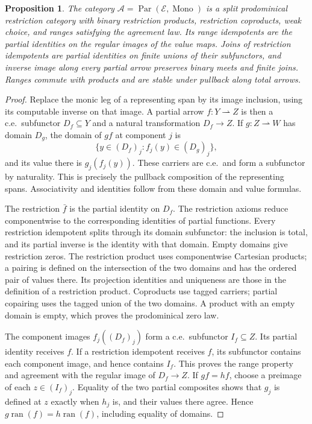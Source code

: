 \documentclass[11pt]{article}
\newtheorem{proposition}[theorem]{Proposition}
\newcommand{\ran}{\operatorname{ran}}
\begin{document}
\begin{proposition}\label{prop:fork-structure}
The category $\mathcal A=\operatorname{Par}(\mathcal E,
\operatorname{Mono})$ is a split prodominical restriction category
with binary restriction products, restriction coproducts, weak
choice, and ranges satisfying the agreement law. Its range idempotents
are the partial identities on the regular images of the value maps.
Joins of restriction idempotents are partial identities on finite
unions of their subfunctors, and inverse image along every partial
arrow preserves binary meets and finite joins. Ranges commute with products and
are stable under pullback along total arrows.
\end{proposition}
\begin{proof}
Replace the monic leg of a representing span by its image
inclusion, using its computable inverse on that image. A partial
arrow $f:Y\rightharpoonup Z$ is then a c.e.\ subfunctor
$D_f\subseteq Y$ and a natural transformation $D_f\to Z$.
If $g:Z\rightharpoonup W$ has domain $D_g$, the domain of $gf$
at component $j$ is
\[
 \{y\in(D_f)_j:f_j(y)\in(D_g)_j\},
\]
and its value there is $g_j(f_j(y))$. These carriers are c.e.\
and form a subfunctor by naturality. This is precisely the
pullback composition of the representing spans. Associativity
and identities follow from these domain and value formulas.

The restriction $\bar f$ is the partial identity on $D_f$.
The restriction axioms reduce componentwise to the corresponding
identities of partial functions. Every restriction idempotent
splits through its domain subfunctor: the inclusion is total,
and its partial inverse is the identity with that domain.
Empty domains give restriction zeros. The restriction product
uses componentwise Cartesian products; a pairing is defined on
the intersection of the two domains and has the ordered pair
of values there. Its projection identities and uniqueness are
those in the definition of a restriction product. Coproducts
use tagged carriers; partial copairing uses the tagged union
of the two domains. A product with an empty domain is empty,
which proves the prodominical zero law.

The component images $f_j((D_f)_j)$ form a c.e.\ subfunctor
$I_f\subseteq Z$. Its partial identity receives $f$. If a restriction
idempotent receives $f$, its subfunctor contains each component image,
and hence contains $I_f$.
This proves the range property and agreement with the regular
image of $D_f\to Z$. If $gf=hf$, choose a preimage of each
$z\in(I_f)_j$. Equality of the two partial composites shows
that $g_j$ is defined at $z$ exactly when $h_j$ is, and their
values there agree. Hence $g\ran(f)=h\ran(f)$, including
equality of domains.


\end{proof}
\end{document}
